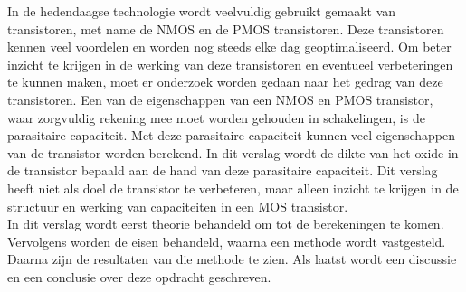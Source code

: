 
In de hedendaagse technologie wordt veelvuldig gebruikt gemaakt van transistoren, met name de NMOS en de PMOS transistoren. Deze transistoren kennen veel voordelen en worden nog steeds elke dag geoptimaliseerd. Om beter inzicht te krijgen in de werking van deze transistoren en eventueel verbeteringen te kunnen maken, moet er onderzoek worden gedaan naar het gedrag van deze transistoren. Een van de eigenschappen van een NMOS en PMOS transistor, waar zorgvuldig rekening mee moet worden gehouden in schakelingen, is de parasitaire capaciteit. Met deze parasitaire capaciteit kunnen veel eigenschappen van de transistor worden berekend. In dit verslag wordt de dikte van het oxide in de transistor bepaald aan de hand van deze parasitaire capaciteit. Dit verslag heeft niet als doel de transistor te verbeteren, maar alleen inzicht te krijgen in de structuur en werking van capaciteiten in een MOS transistor.
\\ \newline
In dit verslag wordt eerst theorie behandeld om tot de berekeningen te komen. Vervolgens worden de eisen behandeld, waarna een methode wordt vastgesteld. Daarna zijn de resultaten van die methode te zien. Als laatst wordt een discussie en een conclusie over deze opdracht geschreven. 


